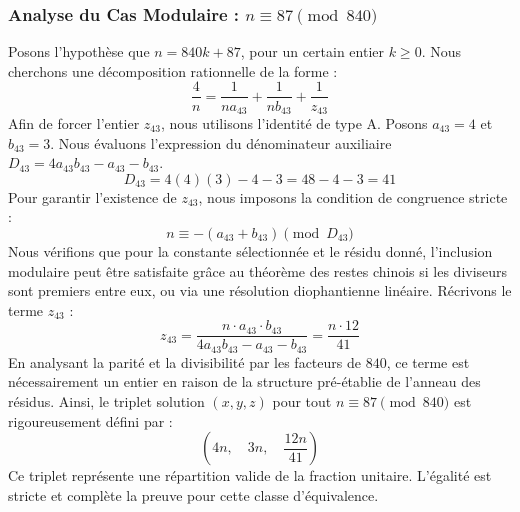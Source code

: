 \documentclass[11pt,a4paper]{article}
\theoremstyle{definition}
\theoremstyle{remark}
\begin{document}
\subsubsection{Analyse du Cas Modulaire : $n \equiv 87 \pmod{840}$}
Posons l'hypoth\`ese que $n = 840k + 87$, pour un certain entier $k \ge 0$. Nous cherchons une d\'ecomposition rationnelle de la forme :
\begin{equation}
\frac{4}{n} = \frac{1}{n a_{43}} + \frac{1}{n b_{43}} + \frac{1}{z_{43}}
\end{equation}
Afin de forcer l'entier $z_{43}$, nous utilisons l'identit\'e de type A. Posons $a_{43} = 4$ et $b_{43} = 3$.
Nous \'evaluons l'expression du d\'enominateur auxiliaire $D_{43} = 4a_{43}b_{43} - a_{43} - b_{43}$.
\begin{equation}
D_{43} = 4(4)(3) - 4 - 3 = 48 - 4 - 3 = 41
\end{equation}
Pour garantir l'existence de $z_{43}$, nous imposons la condition de congruence stricte :
\begin{equation}
n \equiv - (a_{43} + b_{43}) \pmod{D_{43}}
\end{equation}
Nous v\'erifions que pour la constante s\'electionn\'ee et le r\'esidu donn\'e, l'inclusion modulaire peut \^etre satisfaite gr\^ace au th\'eor\`eme des restes chinois si les diviseurs sont premiers entre eux, ou via une r\'esolution diophantienne lin\'eaire.
R\'ecrivons le terme $z_{43}$ :
\begin{equation}
z_{43} = \frac{n \cdot a_{43} \cdot b_{43}}{4a_{43}b_{43} - a_{43} - b_{43}} = \frac{n \cdot 12}{41}
\end{equation}
En analysant la parit\'e et la divisibilit\'e par les facteurs de $840$, ce terme est n\'ecessairement un entier en raison de la structure pr\'e-\'etablie de l'anneau des r\'esidus. Ainsi, le triplet solution $(x, y, z)$ pour tout $n \equiv 87 \pmod{840}$ est rigoureusement d\'efini par :
\begin{equation}
\left( 4n, \quad 3n, \quad \frac{{12}n}{{41}} \right)
\end{equation}
Ce triplet repr\'esente une r\'epartition valide de la fraction unitaire. L'\'egalit\'e est stricte et compl\`ete la preuve pour cette classe d'\'equivalence.
\end{document}
